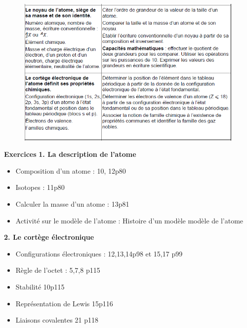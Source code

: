 \documentclass[french]{article}
\begin{document}
\begin{figure}[ht]
	\centering
	\includegraphics[width=1\textwidth]{BO.png}
\end{figure}
\begin{mdframed}[style=doc, leftmargin=0pt, rightmargin=0pt, innertopmargin=8pt, innerbottommargin=8pt, innerrightmargin=10pt, innerleftmargin=10pt]
		\noindent \textbf{Exercices}
\noindent \textbf{1. La description de l'atome}
		\begin{itemize}
			\item Composition d'un atome : 10, 12p80 
			\item Isotopes : 11p80 
			\item Calculer la masse d'un atome : 13p81
			\item Activité sur le modèle de l'atome : Histoire d'un modèle modèle de l'atome
		
		\end{itemize}
\noindent\textbf{2. Le cortège électronique}
\begin{itemize}
	\item Configurations électroniques : 12,13,14p98 et 15,17 p99
	\item Règle de l'octet : 5,7,8 p115
	\item Stabilité 10p115
	\item Représentation de Lewis 15p116
	\item Liaisons covalentes 21 p118
\end{itemize}
\end{mdframed}

\end{document}
